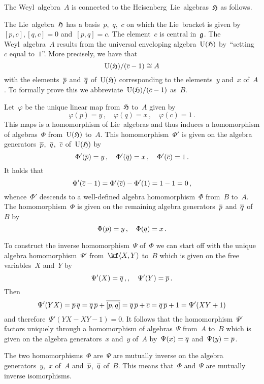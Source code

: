 \begin{remark}
  The Weyl~algebra~$A$ is connected to the {\threedimensional} Heisenberg~Lie~algebras~$\mathfrak{H}$ as follows.

  The Lie~algebra~$\mathfrak{H}$ has a basis~$p$,~$q$,~$c$ on which the Lie~bracket is given by~$[p,c], [q,c] = 0$ and~$[p,q] = c$.
  The element~$c$ is central in~$\mathfrak{g}$.
  The Weyl~algebra~$A$ results from the universal enveloping algebra~$\operatorname{U}(\mathfrak{H})$ by~\enquote{setting~$c$ equal to~$1$}.
  More precisely, we have that
  \[
    \operatorname{U}(\mathfrak{H}) / \lparen \overline{c} - 1 \rparen
    \cong
    A
  \]
  with the elements~$\overline{p}$ and~$\overline{q}$ of~$\operatorname{U}(\mathfrak{H})$ corresponding to the elements~$y$ and~$x$ of~$A$.
  To formally prove this we abbreviate~$\operatorname{U}(\mathfrak{H})/(\overline{c} - 1)$ as~$B$.
  
  Let~$\varphi$ be the unique linear map from~$\mathfrak{H}$ to~$A$ given by
  \[
    \varphi(p) = y \,,
    \quad
    \varphi(q) = x \,,
    \quad
    \varphi(c)  =1 \,.
  \]
  This maps is a homomorphism of Lie~algebras and thus induces a homomorphism of algebras~$\Phi$ from~$\operatorname{U}(\mathfrak{H})$ to~$A$.
  This homomorphism~$\Phi'$ is given on the algebra generators~$\overline{p}$,~$\overline{q}$,~$\overline{c}$ of~$\operatorname{U}(\mathfrak{H})$ by
  \[
    \Phi'( \overline{p} ) = y \,,
    \quad
    \Phi'( \overline{q} ) = x \,,
    \quad
    \Phi'( \overline{c} ) = 1 \,.
  \]
  It holds that
  \[
    \Phi'(\overline{c} - 1)
    =
    \Phi'(\overline{c}) - \Phi'(1)
    =
    1 - 1
    =
    0 \,,
  \]
  whence~$\Phi'$ descends to a well-defined algebra homomorphism~$\Phi$ from~$B$ to~$A$.
  The homomorphism~$\Phi$ is given on the remaining algebra generators~$\overline{p}$ and~$\overline{q}$ of~$B$ by
  \[
    \Phi(\overline{p}) = y \,,
    \quad
    \Phi(\overline{q}) = x \,.
  \]
  
  To construct the inverse homomorphism~$\Psi$ of~$\Phi$ we can start off with the unique algebra homomorphism~$\Psi'$ from~$\kf\gen{X,Y}$ to~$B$ which is given on the free variables~$X$ and~$Y$ by
  \[
    \Psi'(X) = \overline{q} \,,,
    \quad
    \Psi'(Y) = \overline{p} \,.
  \]
  Then
  \[
    \Psi'(YX)
    =
    \overline{p} \, \overline{q}
    =
    \overline{q} \, \overline{p} + \overline{[p,q]}
    =
    \overline{q} \, \overline{p} + \overline{c}
    =
    \overline{q} \, \overline{p} + 1
    =
    \Psi'(XY + 1)
  \]
  and therefore~$\Psi'(YX - XY - 1) = 0$.
  It follows that the homomorphism~$\Psi'$ factors uniquely through a homomorphism of algebras~$\Psi$ from~$A$ to~$B$ which is given on the algebra generators~$x$ and~$y$ of~$A$ by~$\Psi(x) = \overline{q}$ and~$\Psi(y) = \overline{p}$.
  
  The two homomorphisms~$\Phi$ are~$\Psi$ are mutually inverse on the algebra generators~$y$,~$x$ of~$A$ and~$\overline{p}$,~$\overline{q}$ of~$B$.
  This means that~$\Phi$ and~$\Psi$ are mutually inverse isomorphisms.
\end{remark}


